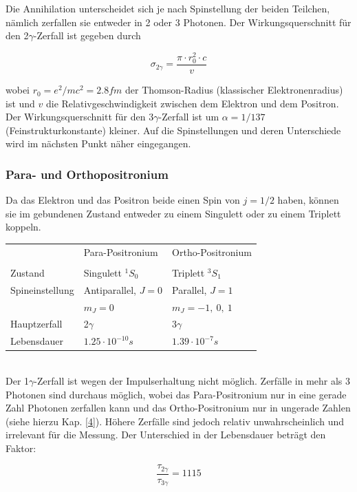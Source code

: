 Die Annihilation unterscheidet sich je nach Spinstellung der beiden Teilchen, nämlich zerfallen sie entweder in 2 oder 3 Photonen.
Der Wirkungsquerschnitt für den 2$\gamma$-Zerfall ist gegeben durch

\begin{equation} \sigma_{2\gamma}=\frac{\pi\cdot r_0^2\cdot c}{v} \end{equation}

wobei $r_0=e^2/mc^2=2.8 fm$ der Thomson-Radius (klassischer Elektronenradius) ist und $v$ die Relativgeschwindigkeit zwischen dem Elektron und dem Positron. Der Wirkungsquerschnitt für den 3$\gamma$-Zerfall ist um $\alpha=1/137$ (Feinstrukturkonstante) kleiner. Auf die Spinstellungen und deren Unterschiede wird im nächsten Punkt näher eingegangen.

\subsubsection{Para- und Orthopositronium}

Da das Elektron und das Positron beide einen Spin von $j=1/2$ haben, können sie im gebundenen Zustand entweder zu einem Singulett oder zu einem Triplett koppeln.\\

\begin{tabular}[H]{p{4cm} p{4cm} p{4cm}}
 & Para-Positronium & Ortho-Positronium\\
 & &\\
Zustand & Singulett $^1S_0$ & Triplett $^3S_1$\\
Spineinstellung & Antiparallel, $J=0$ & Parallel, $J=1$\\
 & $m_J = 0$ & $m_J = -1,\ 0,\ 1$\\
Hauptzerfall & 2$\gamma$ & 3$\gamma$\\
Lebensdauer & $1.25\cdot 10^{-10} s$ & $1.39\cdot 10^{-7} s$\\
\end{tabular}\\

Der 1$\gamma$-Zerfall ist wegen der Impulserhaltung nicht möglich. Zerfälle in mehr als 3 Photonen sind durchaus möglich, wobei das Para-Positronium nur in eine gerade Zahl Photonen zerfallen kann und das Ortho-Positronium nur in ungerade Zahlen (siehe hierzu Kap. \ref{4}). Höhere Zerfälle sind jedoch relativ unwahrscheinlich und irrelevant für die Messung.
Der Unterschied in der Lebensdauer beträgt den Faktor:

\begin{equation} \frac{\tau_{2\gamma}}{\tau_{3\gamma}} = 1115 \end{equation}

